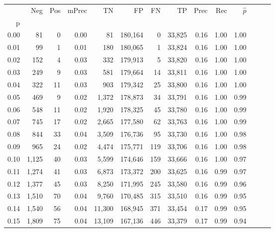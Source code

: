 \begin{tabular}{rrrrrrrrrrrrrr}
\toprule
{} &    Neg &  Pos & mPrec &       TN &       FP &      FN &      TP &  Prec &   Rec & $\hat{p}$ \\
p    &        &      &       &          &          &         &         &       &       &           \\
\midrule
0.00 &     81 &    0 &  0.00 &       81 &  180,164 &       0 &  33,825 &  0.16 &  1.00 &      1.00 \\
0.01 &     99 &    1 &  0.01 &      180 &  180,065 &       1 &  33,824 &  0.16 &  1.00 &      1.00 \\
0.02 &    152 &    4 &  0.03 &      332 &  179,913 &       5 &  33,820 &  0.16 &  1.00 &      1.00 \\
0.03 &    249 &    9 &  0.03 &      581 &  179,664 &      14 &  33,811 &  0.16 &  1.00 &      1.00 \\
0.04 &    322 &   11 &  0.03 &      903 &  179,342 &      25 &  33,800 &  0.16 &  1.00 &      1.00 \\
0.05 &    469 &    9 &  0.02 &    1,372 &  178,873 &      34 &  33,791 &  0.16 &  1.00 &      0.99 \\
0.06 &    548 &   11 &  0.02 &    1,920 &  178,325 &      45 &  33,780 &  0.16 &  1.00 &      0.99 \\
0.07 &    745 &   17 &  0.02 &    2,665 &  177,580 &      62 &  33,763 &  0.16 &  1.00 &      0.99 \\
0.08 &    844 &   33 &  0.04 &    3,509 &  176,736 &      95 &  33,730 &  0.16 &  1.00 &      0.98 \\
0.09 &    965 &   24 &  0.02 &    4,474 &  175,771 &     119 &  33,706 &  0.16 &  1.00 &      0.98 \\
0.10 &  1,125 &   40 &  0.03 &    5,599 &  174,646 &     159 &  33,666 &  0.16 &  1.00 &      0.97 \\
0.11 &  1,274 &   41 &  0.03 &    6,873 &  173,372 &     200 &  33,625 &  0.16 &  0.99 &      0.97 \\
0.12 &  1,377 &   45 &  0.03 &    8,250 &  171,995 &     245 &  33,580 &  0.16 &  0.99 &      0.96 \\
0.13 &  1,510 &   70 &  0.04 &    9,760 &  170,485 &     315 &  33,510 &  0.16 &  0.99 &      0.95 \\
0.14 &  1,540 &   56 &  0.04 &   11,300 &  168,945 &     371 &  33,454 &  0.17 &  0.99 &      0.95 \\
0.15 &  1,809 &   75 &  0.04 &   13,109 &  167,136 &     446 &  33,379 &  0.17 &  0.99 &      0.94 \\

\end{tabular}
